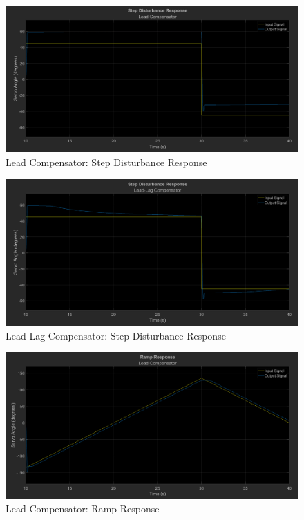 \documentclass[12pt]{article}
\begin{document}
\begin{figure}[h!]
	\centering
    \includegraphics[width=\textwidth]{dist_lead}
    \caption{\label{fig:dist_lead}Lead Compensator: Step Disturbance Response}
\end{figure}

\begin{figure}[h!]
    \centering
    \includegraphics[width=\textwidth]{dist_leadlag}
    \caption{\label{fig:dist_leadlag}Lead-Lag Compensator: Step Disturbance Response}
\end{figure}

\begin{figure}[h!]
	\centering
    \includegraphics[width=\textwidth]{ramp_lead}
    \caption{\label{fig:ramp_lead}Lead Compensator: Ramp Response}
\end{figure}
\end{document}

